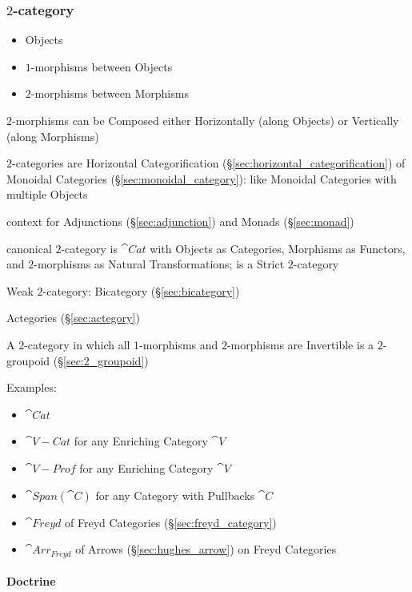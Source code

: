 \subsubsection{$2$-category}\label{sec:2_category}

\begin{itemize}
  \item Objects
  \item $1$-morphisms between Objects
  \item $2$-morphisms between Morphisms
\end{itemize}

$2$-morphisms can be Composed either Horizontally (along Objects) or
Vertically (along Morphisms)

$2$-categories are Horizontal Categorification
(\S\ref{sec:horizontal_categorification}) of Monoidal Categories
(\S\ref{sec:monoidal_category}): like Monoidal Categories with
multiple Objects

context for Adjunctions (\S\ref{sec:adjunction}) and Monads
(\S\ref{sec:monad})

canonical $2$-category is $\cat{Cat}$ with Objects as Categories,
Morphisms as Functors, and $2$-morphisms as Natural Transformations;
is a Strict $2$-category

Weak $2$-category: Bicategory (\S\ref{sec:bicategory})

Actegories (\S\ref{sec:actegory})

A $2$-category in which all $1$-morphisms and $2$-morphisms are
Invertible is a $2$-groupoid (\S\ref{sec:2_groupoid})

Examples:
\begin{itemize}
\item $\cat{Cat}$
\item $\cat{V-Cat}$ for any Enriching Category $\cat{V}$
\item $\cat{V-Prof}$ for any Enriching Category $\cat{V}$
\item $\cat{Span}(\cat{C})$ for any Category with Pullbacks $\cat{C}$
\item $\cat{Freyd}$ of Freyd Categories (\S\ref{sec:freyd_category})
\item $\cat{Arr_{Freyd}}$ of Arrows (\S\ref{sec:hughes_arrow}) on
  Freyd Categories
\end{itemize}



\paragraph{Doctrine}\label{sec:doctrine}\hfill

